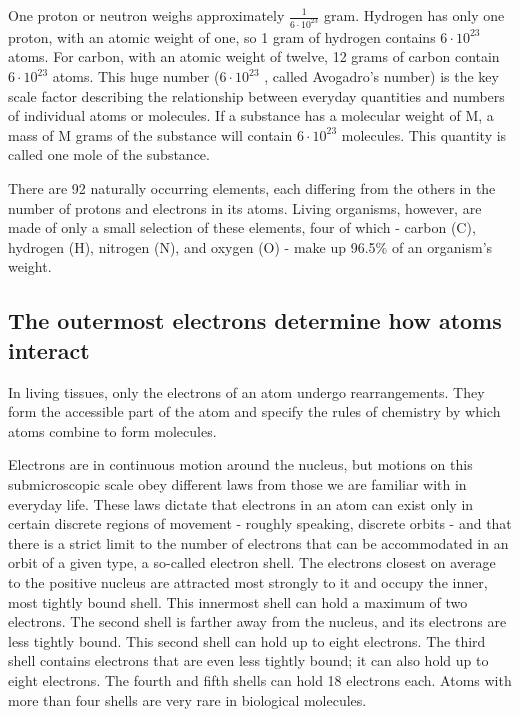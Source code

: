 One proton or neutron weighs approximately $\frac{1}{6 \cdot 10^{23}}$ gram. Hydrogen has
only one proton, with an atomic weight of one, so 1 gram of hydrogen
contains $6 \cdot 10^{23}$ atoms. For carbon, with an atomic weight of twelve,
12 grams of carbon contain $6 \cdot 10^{23}$ atoms. This huge number ($6 \cdot 10^{23}$ ,
called Avogadro’s number) is the key scale factor describing the relationship
between everyday quantities and numbers of individual atoms
or molecules. If a substance has a molecular weight of M, a mass of M
grams of the substance will contain $6 \cdot 10^{23}$ molecules. This quantity is
called one mole of the substance.

There are 92 naturally occurring elements, each differing from the others
in the number of protons and electrons in its atoms. Living organisms,
however, are made of only a small selection of these elements, four of
which - carbon (C), hydrogen (H), nitrogen (N), and oxygen (O) - make up
96.5\% of an organism’s weight.


\subsection{The outermost electrons determine how atoms interact}

In living tissues, only the electrons of an atom undergo rearrangements.
They form the accessible part of the atom and specify the rules of
chemistry by which atoms combine to form molecules.

Electrons are in continuous motion around the nucleus, but motions on
this submicroscopic scale obey different laws from those we are familiar
with in everyday life. These laws dictate that electrons in an atom can exist
only in certain discrete regions of movement - roughly speaking, discrete
orbits - and that there is a strict limit to the number of electrons that can
be accommodated in an orbit of a given type, a so-called electron shell.
The electrons closest on average to the positive nucleus are attracted
most strongly to it and occupy the inner, most tightly bound shell. This
innermost shell can hold a maximum of two electrons. The second shell
is farther away from the nucleus, and its electrons are less tightly bound.
This second shell can hold up to eight electrons. The third shell contains
electrons that are even less tightly bound; it can also hold up to eight
electrons. The fourth and fifth shells can hold 18 electrons each. Atoms
with more than four shells are very rare in biological molecules.

